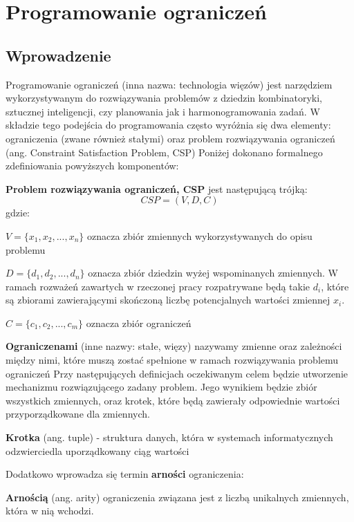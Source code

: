 \chapter{Programowanie ograniczeń}
\thispagestyle{chapterBeginStyle}

\section{Wprowadzenie}
    Programowanie ograniczeń (inna nazwa: technologia więzów) jest narzędziem wykorzystywanym do rozwiązywania 
    problemów z dziedzin kombinatoryki, sztucznej inteligencji, czy planowania jak i harmonogramowania zadań.
    W składzie tego podejścia do programowania często wyróżnia się dwa elementy: ograniczenia (zwane również
    stałymi) oraz problem rozwiązywania ograniczeń (ang. Constraint Satisfaction Problem, CSP)
    Poniżej dokonano formalnego zdefiniowania powyższych komponentów:
    \begin{definition}
        \label{ConstraintProblem}
        \textbf{Problem rozwiązywania ograniczeń, CSP} jest następującą trójką:
        \begin{equation}
            CSP = (V,D,C)
        \end{equation}
        gdzie:

        $V = \{x_{1},x_{2},...,x_{n}\}$ oznacza zbiór zmiennych wykorzystywanych do opisu problemu

        $D = \{d_{1},d_{2},...,d_{n}\}$ oznacza zbiór dziedzin wyżej wspominanych zmiennych. W ramach 
        rozważeń zawartych w rzeczonej pracy rozpatrywane będą takie $d_{i}$, które są zbiorami zawierającymi 
        skończoną liczbę potencjalnych wartości zmiennej $x_{i}$.

        $C = \{c_{1},c_{2},...,c_{m}\}$ oznacza zbiór ograniczeń
    \end{definition}
    \begin{definition}
        \label{Constraint}
        \textbf{Ograniczenami} (inne nazwy: stałe, więzy) nazywamy zmienne oraz zależności między nimi, które muszą zostać spełnione 
        w ramach rozwiązywania problemu ograniczeń
        Przy następujących definicjach oczekiwanym celem będzie utworzenie mechanizmu rozwiązującego zadany problem. Jego wynikiem 
        będzie zbiór wszystkich zmiennych, oraz krotek, które będą zawierały odpowiednie wartości przyporządkowane dla zmiennych.
    \end{definition}
    \begin{definition}
        \label{Krotka}
        \textbf{Krotka} (ang. tuple) - struktura danych, która w systemach informatycznych odzwierciedla uporządkowany ciąg wartości
    \end{definition}
    Dodatkowo wprowadza się termin \textbf{arności} ograniczenia:
    \begin{definition}
        \label{Krotka}
        \textbf{Arnością} (ang. arity) ograniczenia związana jest z liczbą unikalnych zmiennych, która w nią wchodzi.
    \end{definition}

